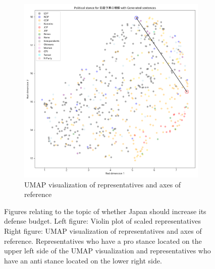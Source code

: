 \documentclass[final,5p,times,twocolumn,authoryear]{elsarticle}
\begin{document}
\begin{figure}[h]
\begin{subfigure}{0.22\textwidth}
      \includegraphics[width=1\linewidth]{figs/results/defence/defencebudget_umap_gen.png}
      \caption{UMAP visualization of representatives and axes of reference}
    \end{subfigure}
\caption{Figures relating to the topic of whether Japan should increase its defense budget.
Left figure: Violin plot of scaled representatives
Right figure: UMAP visualization of representatives and axes of reference. Representatives who have a pro stance located on the upper left side of the UMAP visualization and representatives who have an anti stance located on the lower right side.}
\label{fig: results-defence-budget}
\end{figure}
\end{document}
